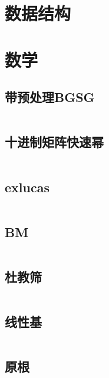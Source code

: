 \documentclass[a4paper,11pt]{article}
\begin{document}
    \newpage
    \section{数据结构}











    \newpage
    \section{数学} %

    \subsection{带预处理BGSG}
    \inputminted[breaklines]{c++}{Math/BGSG.cpp}

    \subsection{十进制矩阵快速幂}
    \inputminted[breaklines]{c++}{Math/快速幂.cpp}

    \subsection{exlucas}
    \inputminted[breaklines]{c++}{Math/exlucas.cpp}

    \subsection{BM}
    \inputminted[breaklines]{c++}{Math/BM.cpp}

    \subsection{杜教筛}
    \inputminted[breaklines]{c++}{Math/杜教筛.cpp}

    \subsection{线性基}
    \inputminted[breaklines]{c++}{Math/线性基.cpp}

    \subsection{原根}
    
\end{document}
